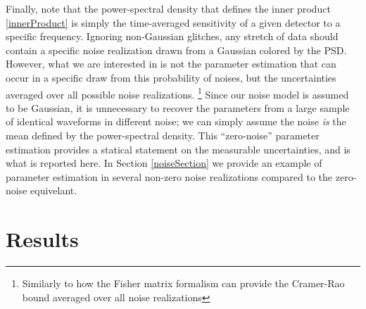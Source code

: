 \documentclass[11pt,a4paper]{emulateapj}
\begin{document}
Finally, note that the power-spectral density that defines the inner product \eqref{innerProduct} is simply 
the time-averaged sensitivity of a given detector to a specific frequency.  Ignoring non-Gaussian glitches,
 any stretch of data should contain a specific noise realization drawn from a Gaussian colored by the PSD.
   However, what we are interested in is not the parameter estimation that can occur in a specific draw
    from this probability of noises, but the uncertainties averaged over all possible noise realizations.
    \footnote{Similarly to how the Fisher matrix formalism can provide the Cramer-Rao bound averaged over
     all noise realizations} Since our noise model is assumed to be Gaussian, it is unnecessary to recover the
      parameters from a large sample of identical waveforms in different noise; we can simply assume the 
      noise \emph{is} the mean defined by the power-spectral density.  This ``zero-noise'' parameter estimation
       provides a statical statement on the measurable uncertainties, and is what is reported here.  In Section
        \ref{noiseSection} we provide an example of parameter estimation in several non-zero noise realizations
compared to the zero-noise equivelant. 


\section{Results}
\label{resultsSection} 
\end{document}
